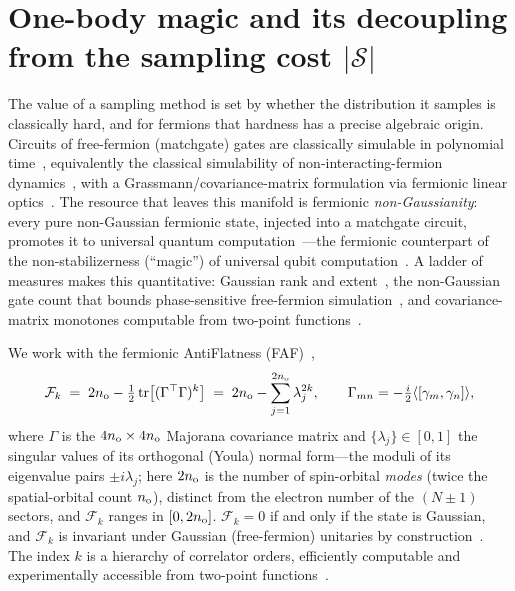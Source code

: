 \section{One-body magic and its decoupling from the sampling cost $|\mathcal S|$}\label{sec:resource}

The value of a sampling method is set by whether the distribution it samples is classically hard, and
for fermions that hardness has a precise algebraic origin. Circuits of free-fermion (matchgate) gates
are classically simulable in polynomial time~\cite{valiant2002}, equivalently the classical
simulability of non-interacting-fermion dynamics~\cite{terhaldivincenzo2002}, with a
Grassmann/covariance-matrix formulation via fermionic linear optics~\cite{bravyi2005flo,jozsamiyake2008}.
The resource that leaves this manifold is fermionic \emph{non-Gaussianity}: every pure non-Gaussian
fermionic state, injected into a matchgate circuit, promotes it to universal quantum
computation~\cite{hebenstreit2019}---the fermionic counterpart of the non-stabilizerness (``magic'')
of universal qubit computation~\cite{bravyikitaev2005,leone2022sre}. A ladder of measures makes this
quantitative: Gaussian rank and extent~\cite{cudbystrelchuk2023}, the non-Gaussian gate count that
bounds phase-sensitive free-fermion simulation~\cite{reardonsmith2024,diaskoenig2024}, and
covariance-matrix monotones computable from two-point functions~\cite{tarabunga2026,collura2026}.

We work with the fermionic AntiFlatness (FAF)~\cite{sierant2026},
\begin{equation}
\mathcal F_k \;=\; 2n_{\rm o}-\tfrac12\,\mathrm{tr}\bigl[(\Gamma^{\top}\Gamma)^k\bigr] \;=\; 2n_{\rm o}-\sum_{j=1}^{2n_{\rm o}}\lambda_j^{2k},
\qquad \Gamma_{mn}=-\tfrac{i}{2}\langle[\gamma_m,\gamma_n]\rangle,
\label{eq:faf}
\end{equation}
where $\Gamma$ is the $4n_{\rm o}\times4n_{\rm o}$ Majorana covariance matrix and $\{\lambda_j\}\in[0,1]$
the singular values of its orthogonal (Youla) normal form---the moduli of its eigenvalue pairs
$\pm i\lambda_j$; here $2n_{\rm o}$ is the number of spin-orbital \emph{modes} (twice the spatial-orbital
count $n_{\rm o}$), distinct from the electron number of the $(N\pm1)$ sectors, and $\mathcal F_k$ ranges in $[0,2n_{\rm o}]$.
$\mathcal F_k=0$ if and only if the state is Gaussian, and $\mathcal F_k$ is invariant
under Gaussian (free-fermion) unitaries by construction~\cite{sierant2026}. The index $k$ is a
hierarchy of correlator orders, efficiently computable and experimentally accessible from two-point
functions~\cite{sierant2026,bittel2025,tarabunga2026}.

